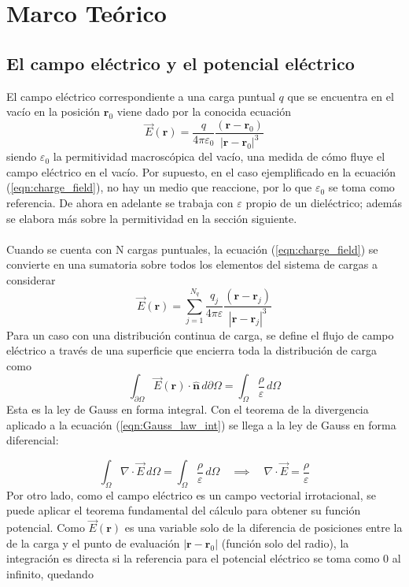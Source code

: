 \documentclass[12pt, twoside, onehalfspace, numbers, spanish]{ezthesis}
\numberwithin{equation}{section}
\begin{document}


\chapter{Marco Teórico}\label{Chap:Teoria}
\section{El campo eléctrico y el potencial eléctrico}\label{Sec:E_field_Pot_elec}
El campo eléctrico correspondiente a una carga puntual $q$ que se encuentra en el vacío en la posición $\mathbf{r}_0$ viene dado por la conocida ecuación
\begin{equation}\label{eqn:charge_field}
\vec{E}(\mathbf{r}) = \frac{q}{4\pi\varepsilon_0}\frac{(\mathbf{r} - \mathbf{r}_0)}{|\mathbf{r}-\mathbf{r}_0|^3}
\end{equation}
siendo $\varepsilon_0$ la permitividad macroscópica del vacío, una medida de cómo fluye el campo eléctrico en el vacío. Por supuesto, en el caso ejemplificado en la ecuación (\ref{eqn:charge_field}), no hay un medio que reaccione, por lo que $\varepsilon_0$ se toma como referencia. De ahora en adelante se trabaja con $\varepsilon$ propio de un dieléctrico; además se elabora más sobre la permitividad en la sección siguiente.\\\\
Cuando se cuenta con N cargas puntuales, la ecuación (\ref{eqn:charge_field}) se convierte en una sumatoria sobre todos los elementos del sistema de cargas a considerar
\begin{equation}\label{eqn:electric_field_sum}
\vec{E}(\mathbf{r}) = \sum_{j=1}^{N_q}\frac{q_j}{4\pi\varepsilon}\frac{(\mathbf{r} - \mathbf{r}_j)}{|\mathbf{r}-\mathbf{r}_j|^3}
\end{equation}
Para un caso con una distribución continua de carga, se define el flujo de campo eléctrico a través de una superficie que encierra toda la distribución de carga como
\begin{equation}
\int_{\partial\Omega}\vec{E}(\mathbf{r})\cdot \hat{\mathbf{n}}\, d\partial\Omega = \int_{\Omega} \frac{\rho}{\varepsilon}\, d\Omega \label{eqn:Gauss_law_int}
\end{equation}
Esta es la ley de Gauss en forma integral. Con el teorema de la divergencia aplicado a la ecuación (\ref{eqn:Gauss_law_int}) se llega a la ley de Gauss en forma diferencial:

\begin{equation}
\int_{\Omega} \nabla\cdot\vec{E} \, d\Omega = \int_\Omega \frac{\rho}{\varepsilon}\, d\Omega \quad\implies\quad \nabla\cdot\vec{E} = \frac{\rho}{\varepsilon} \label{eqn:Gauss_law_diff}
\end{equation}
\noindent
Por otro lado, como el campo eléctrico es un campo vectorial irrotacional, se puede aplicar el teorema fundamental del cálculo para obtener su función potencial. Como $\vec{E}(\mathbf{r})$ es una variable solo de la diferencia de posiciones entre la de la carga y el punto de evaluación $|\mathbf{r} - \mathbf{r}_0|$ (función solo del radio), la integración es directa si la referencia para el potencial eléctrico se toma como $0$ al infinito, quedando
\end{document}
